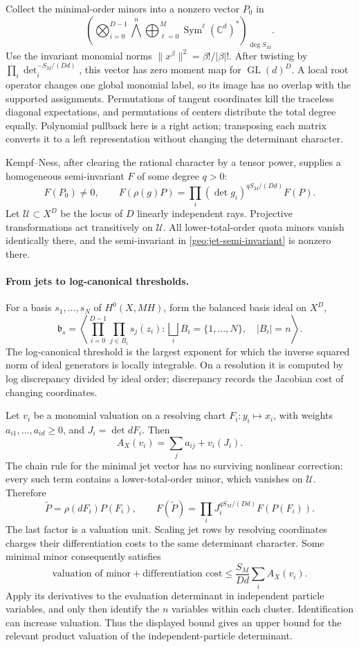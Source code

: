 Collect the minimal-order minors into a nonzero vector \(P_0\) in
\[
 \left(\bigotimes_{i=0}^{D-1}
 \bigwedge^n\bigoplus_{\ell=0}^{M}
              \operatorname{Sym}^{\ell}(\mathbb C^d)^*\right)_{\deg S_M}.
\]
Use the invariant monomial norms \(\|x^\beta\|^2=\beta!/|\beta|!\).
After twisting by \(\prod_i\det_i^{-S_M/(Dd)}\), this vector has zero
moment map for \(\operatorname{GL}(d)^D\). A local root operator changes
one global monomial label, so its image has no overlap with the supported
assignments. Permutations of tangent coordinates kill the traceless
diagonal expectations, and permutations of centers distribute the total
degree equally. Polynomial pullback here is a right action; transposing
each matrix converts it to a left representation without changing the
determinant character.

Kempf--Ness, after clearing the rational character by a tensor power,
supplies a homogeneous semi-invariant \(F\) of some degree \(q>0\):
\begin{equation}
 F(P_0)\ne0,\qquad
 F(\rho(g)P)=\prod_i(\det g_i)^{qS_M/(Dd)}F(P).
 \label{geo:jet-semi-invariant}
\end{equation}
Let \(\mathcal U\subset X^D\) be the locus of \(D\) linearly independent
rays. Projective transformations act transitively on \(\mathcal U\).
All lower-total-order quota minors vanish identically there, and the
semi-invariant in \eqref{geo:jet-semi-invariant} is nonzero there.

\paragraph{From jets to log-canonical thresholds.}
For a basis \(s_1,\ldots,s_N\) of \(H^0(X,MH)\), form the balanced basis
ideal on \(X^D\),
\[
 \mathfrak b_s=
 \left\langle\prod_{i=0}^{D-1}\prod_{j\in B_i}s_j(z_i):
 \bigsqcup_i B_i=\{1,\ldots,N\},\quad |B_i|=n\right\rangle.
\]
The log-canonical threshold is the largest exponent for which the inverse
squared norm of ideal generators is locally integrable. On a resolution
it is computed by log discrepancy divided by ideal order; discrepancy
records the Jacobian cost of changing coordinates.

Let \(v_i\) be a monomial valuation on a resolving chart
\(F_i:y_i\mapsto x_i\), with weights \(a_{i1},\ldots,a_{id}\ge0\), and
\(J_i=\det dF_i\). Then
\[
 A_X(v_i)=\sum_j a_{ij}+v_i(J_i).
\]
The chain rule for the minimal jet vector has no surviving nonlinear
correction: every such term contains a lower-total-order minor, which
vanishes on \(\mathcal U\). Therefore
\[
 \widetilde P=\rho(dF_i)P(F_i),\qquad
 F(\widetilde P)=
 \prod_iJ_i^{qS_M/(Dd)}F(P(F_i)).
\]
The last factor is a valuation unit. Scaling jet rows by resolving
coordinates charges their differentiation costs to the same determinant
character. Some minimal minor consequently satisfies
\[
 \text{valuation of minor}+\text{differentiation cost}
 \le\frac{S_M}{Dd}\sum_i A_X(v_i).
\]
Apply its derivatives to the evaluation determinant in independent
particle variables, and only then identify the \(n\) variables within
each cluster. Identification can increase valuation. Thus the displayed
bound gives an upper bound for the relevant product valuation of the
independent-particle determinant.

